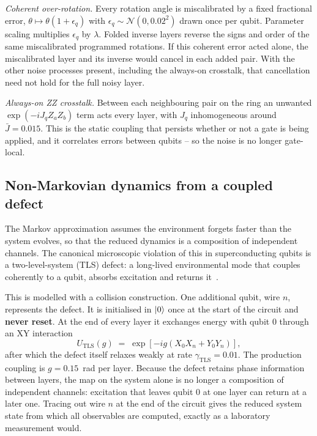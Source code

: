 \documentclass[Thesis.tex]{subfiles}
\begin{document}
\emph{Coherent over-rotation.} Every rotation angle is miscalibrated by a fixed
fractional error, $\theta \mapsto \theta(1 + \epsilon_q)$ with
$\epsilon_q \sim \mathcal{N}(0, 0.02^2)$ drawn once per qubit. Parameter scaling
multiplies $\epsilon_q$ by $\lambda$. Folded inverse layers reverse the signs
and order of the same miscalibrated programmed rotations. If this coherent
error acted alone, the miscalibrated layer and its inverse would cancel in each
added pair. With the other noise processes present, including the always-on
crosstalk, that cancellation need not hold for the full noisy layer.

\emph{Always-on ZZ crosstalk.} Between each neighbouring pair on the ring an
unwanted $\exp(-i J_q Z_a Z_b)$ term acts every layer, with $J_q$ inhomogeneous
around $\bar{J} = 0.015$. This is the static coupling that persists whether or not a
gate is being applied, and it correlates errors between qubits -- so the noise is no
longer gate-local.

\subsection{Non-Markovian dynamics from a coupled defect}

The Markov approximation assumes the environment forgets faster than the system
evolves, so that the reduced dynamics is a composition of independent channels. The
canonical microscopic violation of this in superconducting qubits is a two-level-system
(TLS) defect: a long-lived environmental mode that couples coherently to a qubit,
absorbs excitation and returns it~\cite{mueller2019tls,klimov2018fluctuations}.

This is modelled with a collision construction. One additional qubit, wire $n$,
represents the defect. It is initialised in $\ket{0}$ once at the start of the
circuit and \textbf{never reset}. At the end of every layer it exchanges energy with
qubit $0$ through an XY interaction
\begin{equation}
    U_{\text{TLS}}(g) \;=\; \exp\!\left[ -i g \left( X_0 X_{n} + Y_0 Y_{n} \right) \right],
    \label{eq:ch3_tls}
\end{equation}
after which the defect itself relaxes weakly at rate $\gamma_{\text{TLS}} = 0.01$.
The production coupling is $g = 0.15$~rad per layer. Because the defect retains
phase information between layers, the map on the system alone is no longer a
composition of independent channels: excitation that leaves qubit $0$ at one layer
can return at a later one. Tracing out wire $n$ at the end of the circuit gives the
reduced system state from which all observables are computed, exactly as a
laboratory measurement would.
\end{document}
